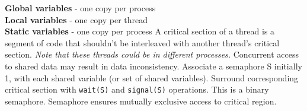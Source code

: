 \documentclass[number]{notes}
\begin{document}
\begin{landscape}
\begin{multicols}{3}
\textbf{Global variables} - one copy per process\\
\textbf{Local variables} - one copy per thread\\
\textbf{Static variables} - one copy per process
A critical section of a thread is a segment of code that shouldn't be interleaved with another thread's critical section. \textit{Note that these threads could be in different processes.} Concurrent access to shared data may result in data inconsistency.
Associate a semaphore S initially 1, with each shared variable (or set of shared variables). Surround corresponding critical section with \texttt{wait(S)} and \texttt{signal(S)} operations. This is a binary semaphore. Semaphore ensures mutually exclusive access to critical region.


\end{multicols}
\end{landscape}
\end{document}
